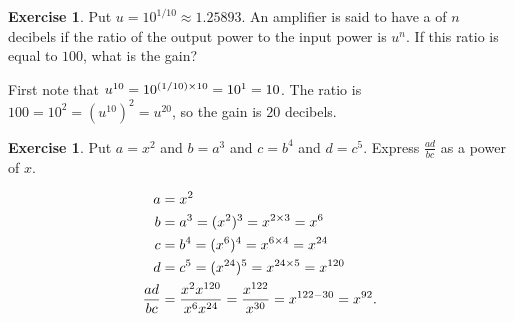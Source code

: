 \documentclass[a4paper]{book}
\theoremstyle{definition}
\newtheorem{exercise}[theorem]{Exercise}
\renewenvironment{solution}{\SolutionInline}{\endSolutionInline}
\begin{document}
\begin{exercise}
 Put $u=10^{1/10}\approx 1.25893$.  An amplifier is said to have a
  of $n$ decibels if the ratio of the output power to the
 input power is $u^n$.  If this ratio is equal to $100$, what is the
 gain? 
\end{exercise}
\begin{solution}
 First note that $u^{10}=10^{(1/10)\times 10}=10^1=10$.  The ratio is
 $100=10^2=(u^{10})^2=u^{20}$, so the gain is $20$ decibels.
\end{solution}
\begin{exercise}
 Put $a=x^2$ and $b=a^3$ and $c=b^4$ and $d=c^5$.  Express
 $\frac{ad}{bc}$ as a power of $x$.
\end{exercise}
\begin{solution}
 \begin{align*}
  a &= x^2 \\
  b &= a^3 = (x^2)^3 = x^{2\times 3} = x^6 \\
  c &= b^4 = (x^6)^4 = x^{6\times 4} = x^{24} \\
  d &= c^5 = (x^{24})^5 = x^{24\times 5} = x^{120} \\
  \frac{ad}{bc} &= \frac{x^2 x^{120}}{x^6 x^{24}}
                 = \frac{x^{122}}{x^{30}} = x^{122-30} = x^{92}.
 \end{align*}
\end{solution}
\end{document}
